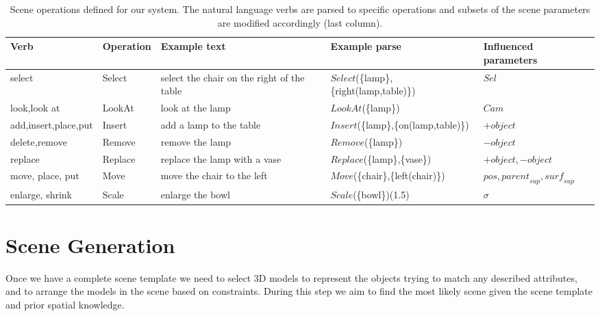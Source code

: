\documentclass{sigchi}
\begin{document}
\begin{table*}
  \centering
  \small
  \begin{tabular}{lllll}
    Verb          & Operation &                  Example text              &                  Example parse           &  Influenced parameters \\ \toprule
    select         &  Select   & select the chair on the right of the table & $Select$(\{lamp\},\{right(lamp,table)\}) &  $\textit{Sel}$ \\
    look,look at      &  LookAt   &              look at the lamp              &            $LookAt$(\{lamp\})            &  $\textit{Cam}$ \\
    add,insert,place,put &  Insert   &          add a lamp to the table           &  $Insert$(\{lamp\},\{on(lamp,table)\})   &  $+\textit{object}$ \\
    delete,remove      &  Remove   &              remove the lamp               &            $Remove$(\{lamp\})            &  $-\textit{object}$ \\
    replace         &  Replace  &        replace the lamp with a vase        &       $Replace$(\{lamp\},\{vase\})       &  $+\textit{object},-\textit{object}$ \\
    move, place, put    &  Move     &         move the chair to the left         &    $Move$(\{chair\},\{left(chair)\})     &  $\textit{pos},\textit{parent}_\textit{sup},\textit{surf}_\textit{sup}$ \\
    enlarge, shrink     &  Scale    &         enlarge the bowl                   &    $Scale$(\{bowl\})(1.5)                &  $\sigma$ \\
  \end{tabular}
  \caption{Scene operations defined for our system.  The natural language verbs are parsed to specific operations and subsets of the scene parameters are modified accordingly (last column).}
  \label{tab:sceneOperations}
\end{table*}


\section{Scene Generation}
\label{sec:sceneGeneration}
Once we have a complete scene template we need to select 3D models to represent the objects trying to match any described attributes, and to arrange the models in the scene based on constraints.  During this step we aim to find the most likely scene given the scene template and prior spatial knowledge.
\end{document}
